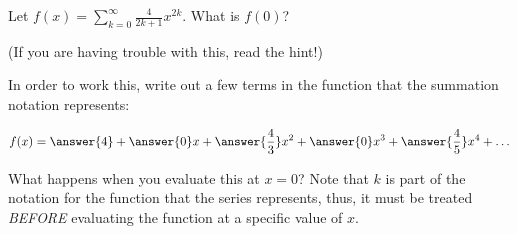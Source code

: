 \documentclass{ximera}
\author{Jim Talamo}
\begin{document}
\begin{exercise}
Let $f(x) = \sum_{k=0}^{\infty} \frac{4}{2k+1}x^{2k}$.  What is $f(0)$?

\begin{multipleChoice}
\end{multipleChoice}

(If you are having trouble with this, read the hint!)

\begin{hint}
In order to work this, write out a few terms in the function that the summation notation represents:

\[
f(x) = \answer{4}+\answer{0}x+\answer{\frac{4}{3}}x^2+\answer{0}x^3+\answer{\frac{4}{5}}x^4 + \ldots
\]

What happens when you evaluate this at $x=0$?  Note that $k$ is part of the notation for the function that the series represents, thus, it must be treated \emph{BEFORE} evaluating the function at a specific value of $x$.


\end{hint}
\end{exercise}
\end{document}
